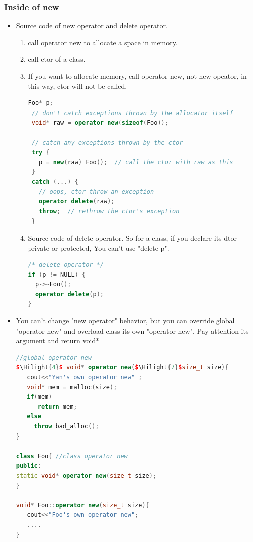 \documentclass[a4paper,12pt,twoside]{book}
\newcommand{\Hilight}[1]{\makebox[0pt][l]{\color{yellow}\rule[-3pt]{#1em}{11pt}}}
\begin{document}
\subsubsection{Inside of new}
\begin{itemize}
\item Source code of new operator and delete operator.
\begin{enumerate}
\item call operator new to allocate a space in memory.
\item call ctor of a class.
\item If you want to allocate memory, call operator new, not new opeator, in this way, ctor will not be called.

\begin{lstlisting}[frame=single, language=c++]
Foo* p;
 // don't catch exceptions thrown by the allocator itself
 void* raw = operator new(sizeof(Foo));

 // catch any exceptions thrown by the ctor
 try {
   p = new(raw) Foo();  // call the ctor with raw as this
 }
 catch (...) {
   // oops, ctor throw an exception
   operator delete(raw);
   throw;  // rethrow the ctor's exception
 }
\end{lstlisting}

\item Source code of delete operator. So for a class, if you declare its dtor private or protected, You can't use "delete p".
\begin{lstlisting}[frame=single, language=c++]
/* delete operator */
if (p != NULL) {
  p->~Foo();
  operator delete(p);
}
\end{lstlisting}
\end{enumerate}

\item You can't change "new operator" behavior, but you can override global "operator new" and overload class its own "operator new". Pay attention its argument and return void*

\begin{lstlisting}[frame=single, language=c++, mathescape=true]
//global operator new
$\Hilight{4}$ void* operator new($\Hilight{7}$size_t size){
   cout<<"Yan's own operator new" ;
   void* mem = malloc(size);
   if(mem)
      return mem;
   else
     throw bad_alloc();
}

class Foo{ //class operator new
public:
static void* operator new(size_t size);
}

void* Foo::operator new(size_t size){
   cout<<"Foo's own operator new";
   ....
}


\end{lstlisting}
\end{itemize}
\end{document}
